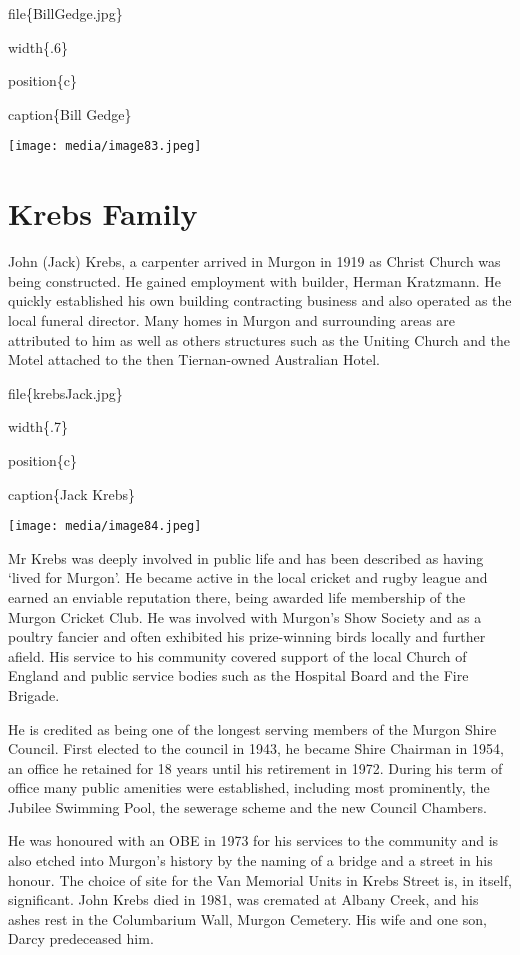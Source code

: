 file\{BillGedge.jpg\}

width\{.6\}

position\{c\}

caption\{Bill Gedge\}

\texttt{[image: media/image83.jpeg]}

\hypertarget{krebs-family}{%
\section{Krebs Family}\label{krebs-family}}

John (Jack) Krebs, a carpenter arrived in Murgon in 1919 as Christ Church was being constructed. He gained employment with builder, Herman Kratzmann. He quickly established his own building contracting business and also operated as the local funeral director. Many homes in Murgon and surrounding areas are attributed to him as well as others structures such as the Uniting Church and the Motel attached to the then Tiernan-owned Australian Hotel.

file\{krebsJack.jpg\}

width\{.7\}

position\{c\}

caption\{Jack Krebs\}

\texttt{[image: media/image84.jpeg]}

Mr Krebs was deeply involved in public life and has been described as having `lived for Murgon'. He became active in the local cricket and rugby league and earned an enviable reputation there, being awarded life membership of the Murgon Cricket Club. He was involved with Murgon's Show Society and as a poultry fancier and often exhibited his prize-winning birds locally and further afield. His service to his community covered support of the local Church of England and public service bodies such as the Hospital Board and the Fire Brigade.

He is credited as being one of the longest serving members of the Murgon Shire Council. First elected to the council in 1943, he became Shire Chairman in 1954, an office he retained for 18 years until his retirement in 1972. During his term of office many public amenities were established, including most prominently, the Jubilee Swimming Pool, the sewerage scheme and the new Council Chambers.

He was honoured with an OBE in 1973 for his services to the community and is also etched into Murgon's history by the naming of a bridge and a street in his honour. The choice of site for the Van Memorial Units in Krebs Street is, in itself, significant. John Krebs died in 1981, was cremated at Albany Creek, and his ashes rest in the Columbarium Wall, Murgon Cemetery. His wife and one son, Darcy predeceased him.

